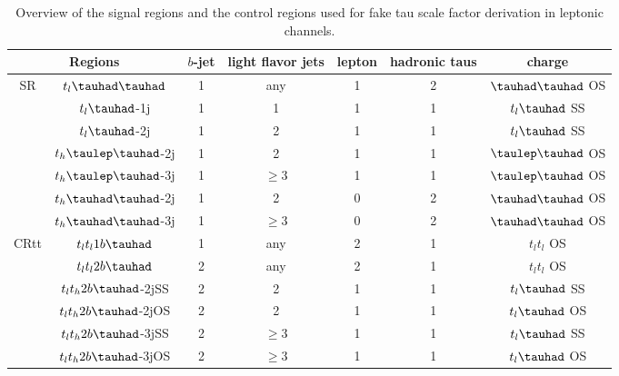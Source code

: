 \begin{table}
\centering
\caption{Overview of the signal regions and the control regions used for fake tau scale factor derivation in leptonic channels.}
\label{tab:srcr}
\begin{tabular}[h]{c|c|c|c|c|c|c}
\hline \hline
\multicolumn{2}{c|}{Regions} & $b$-jet & light flavor jets        & lepton & hadronic taus & charge\\ \hline
\multirow{7}{*}{SR}&$t_l\thadhad$     & 1     & any                                & 1      & 2             & $\thadhad$ OS\\ \cline{2-7}
&$t_l\tauhad$-1j  & 1     & 1                                   & 1      & 1                     & $t_l\tauhad$ SS\\ \cline{2-7}
&$t_l\tauhad$-2j  & 1     & 2                                        & 1      & 1                     & $t_l\tauhad$ SS\\ \cline{2-7}
&$t_h\tlhad$-2j   & 1     & 2                           & 1      & 1             & $\tlhad$ OS\\ \cline{2-7}
&$t_h\tlhad$-3j   & 1     & $\ge3$                      & 1      & 1             & $\tlhad$ OS\\ \cline{2-7}
&$t_h\thadhad$-2j & 1     & 2                            & 0      & 2             & $\thadhad$ OS\\ \cline{2-7}
&$t_h\thadhad$-3j & 1     & $\ge3$                       & 0      & 2             & $\thadhad$ OS\\ \hline
\multirow{6}{*}{CRtt}&$t_lt_l1b\tauhad$ & 1     & any                           & 2      & 1                     & $t_lt_l$ OS\\ \cline{2-7}
&$t_lt_l2b\tauhad$      & 2     & any                           & 2      & 1                     & $t_lt_l$ OS\\ \cline{2-7}
&$t_lt_h2b\tauhad$-2jSS & 2     & 2                             & 1      & 1             & $t_l\tauhad$ SS\\ \cline{2-7}
&$t_lt_h2b\tauhad$-2jOS & 2     & 2                             & 1      & 1             & $t_l\tauhad$ OS\\ \cline{2-7}
&$t_lt_h2b\tauhad$-3jSS & 2     & $\ge3$                        & 1      & 1             & $t_l\tauhad$ SS\\ \cline{2-7}
&$t_lt_h2b\tauhad$-3jOS & 2     & $\ge3$                & 1      & 1             & $t_l\tauhad$ OS\\ \hline
\end{tabular}
\end{table}

